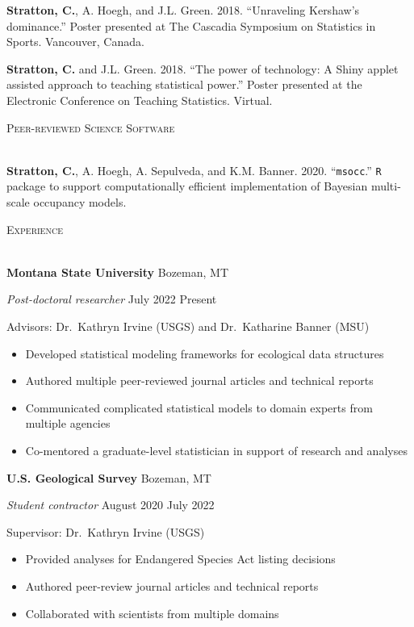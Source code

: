 \documentclass[a4paper]{article}
\newcommand{\lineunder} {
	\vspace*{-8pt} \\
	\hspace*{-18pt} \hrulefill \\
}
\newcommand{\header} [1] {
	{\hspace*{-18pt}\vspace*{6pt} \textsc{#1}}
	\vspace*{-6pt} \lineunder
}
\begin{document}
\textbf{Stratton, C.}, A. Hoegh, and J.L. Green. 2018. ``Unraveling
Kershaw's dominance.'' Poster presented at The Cascadia Symposium on
Statistics in Sports. Vancouver, Canada. \vspace*{2mm}

\textbf{Stratton, C.} and J.L. Green. 2018. ``The power of technology: A
Shiny applet assisted approach to teaching statistical power.'' Poster
presented at the Electronic Conference on Teaching Statistics. Virtual.
\vspace*{2mm}

\header{Peer-reviewed Science Software}
\vspace*{2mm}

\textbf{Stratton, C.}, A. Hoegh, A. Sepulveda, and K.M. Banner. 2020.
``\texttt{msocc}.'' \texttt{R} package to support computationally
efficient implementation of Bayesian multi-scale occupancy models.
\vspace*{2mm}

\header{Experience}
\vspace*{2mm}

\textbf{Montana State University} \hfill Bozeman, MT

\textit{Post-doctoral researcher} \hfill July 2022 \textbar{} Present

Advisors: Dr.~Kathryn Irvine (USGS) and Dr.~Katharine Banner (MSU)

\vspace{-1mm}
\begin{itemize} \itemsep 1pt
    \item Developed statistical modeling frameworks for ecological data structures
    \item Authored multiple peer-reviewed journal articles and technical reports
    \item Communicated complicated statistical models to domain experts from multiple agencies
    \item Co-mentored a graduate-level statistician in support of research and analyses
\end{itemize}

\textbf{U.S. Geological Survey} \hfill Bozeman, MT

\textit{Student contractor} \hfill August 2020 \textbar{} July 2022

Supervisor: Dr.~Kathryn Irvine (USGS)

\vspace{-1mm}
\begin{itemize} \itemsep 1pt
   \item Provided analyses for Endangered Species Act listing decisions
   \item Authored peer-review journal articles and technical reports
   \item Collaborated with scientists from multiple domains 
\end{itemize}
\end{document}
